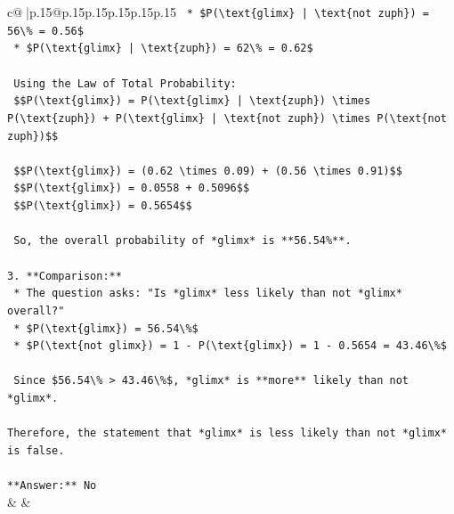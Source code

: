 \documentclass{article}
\begin{document}
{\begin{supertabular}{c@{$\;$}|p{.15\linewidth}@{}p{.15\linewidth}p{.15\linewidth}p{.15\linewidth}p{.15\linewidth}p{.15\linewidth}}
{{{\texttt{    *   \$P(\textbackslash{}text\{glimx\} | \textbackslash{}text\{not zuph\}) = 56\textbackslash{}\% = 0.56\$} \\
\texttt{    *   \$P(\textbackslash{}text\{glimx\} | \textbackslash{}text\{zuph\}) = 62\textbackslash{}\% = 0.62\$} \\
\\ 
\texttt{    Using the Law of Total Probability:} \\
\texttt{    \$\$P(\textbackslash{}text\{glimx\}) = P(\textbackslash{}text\{glimx\} | \textbackslash{}text\{zuph\}) \textbackslash{}times P(\textbackslash{}text\{zuph\}) + P(\textbackslash{}text\{glimx\} | \textbackslash{}text\{not zuph\}) \textbackslash{}times P(\textbackslash{}text\{not zuph\})\$\$} \\
\\ 
\texttt{    \$\$P(\textbackslash{}text\{glimx\}) = (0.62 \textbackslash{}times 0.09) + (0.56 \textbackslash{}times 0.91)\$\$} \\
\texttt{    \$\$P(\textbackslash{}text\{glimx\}) = 0.0558 + 0.5096\$\$} \\
\texttt{    \$\$P(\textbackslash{}text\{glimx\}) = 0.5654\$\$} \\
\\ 
\texttt{    So, the overall probability of *glimx* is **56.54\%**.} \\
\\ 
\texttt{3.  **Comparison:**} \\
\texttt{    *   The question asks: "Is *glimx* less likely than not *glimx* overall?"} \\
\texttt{    *   \$P(\textbackslash{}text\{glimx\}) = 56.54\textbackslash{}\%\$} \\
\texttt{    *   \$P(\textbackslash{}text\{not glimx\}) = 1 {-} P(\textbackslash{}text\{glimx\}) = 1 {-} 0.5654 = 43.46\textbackslash{}\%\$} \\
\\ 
\texttt{    Since \$56.54\textbackslash{}\% > 43.46\textbackslash{}\%\$, *glimx* is **more** likely than not *glimx*.} \\
\\ 
\texttt{Therefore, the statement that *glimx* is less likely than not *glimx* is false.} \\
\\ 
\texttt{**Answer:** No} \\
            }
        }
    }
    & & \\ \\


\end{supertabular}}
\end{document}
